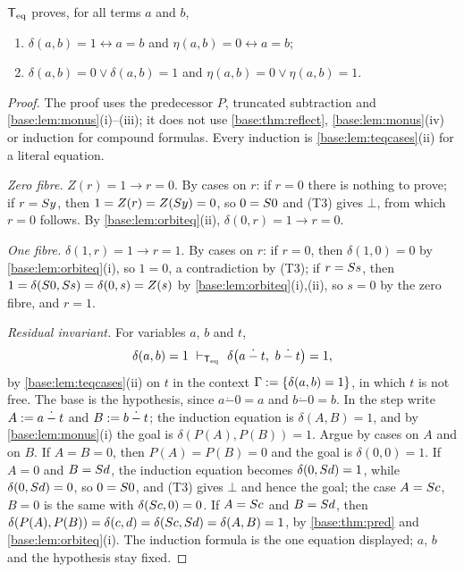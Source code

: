 \begin{theorem}
\label{base:thm:orbitreflect}
$\mathsf{T}_{\mathrm{eq}}$ proves, for all terms $a$ and $b$,
\begin{enumerate}[label=\textup{(\roman*)}]
\item $\delta(a,b)=1\leftrightarrow a=b$ and $\eta(a,b)=0\leftrightarrow a=b$;
\item $\delta(a,b)=0\vee\delta(a,b)=1$ and $\eta(a,b)=0\vee\eta(a,b)=1$.
\end{enumerate}
\end{theorem}

\begin{proof}
The proof uses the predecessor $P$, truncated subtraction and
\cref{base:lem:monus}(i)--(iii); it does not use \cref{base:thm:reflect},
\cref{base:lem:monus}(iv) or induction for compound formulas.  Every
induction is \cref{base:lem:teqcases}(ii) for a literal equation.

\emph{Zero fibre.}  $Z(r)=1\to r=0$.  By cases on $r$: if $r=0$ there is
nothing to prove; if $r=S y$, then $1=Z(r)=Z(S y)=0$, so $0=S 0$
and (T3) gives $\bot$, from which $r=0$ follows.  By
\cref{base:lem:orbiteq}(ii), $\delta(0,r)=1\to r=0$.

\emph{One fibre.}  $\delta(1,r)=1\to r=1$.  By cases on $r$: if $r=0$, then
$\delta(1,0)=0$ by \cref{base:lem:orbiteq}(i), so $1=0$, a contradiction by
(T3); if $r=S s$, then
$1=\delta(S 0,S s)=\delta(0,s)=Z(s)$ by
\cref{base:lem:orbiteq}(i),(ii), so $s=0$ by the zero fibre, and $r=1$.

\emph{Residual invariant.}  For variables $a$, $b$ and $t$,
\[
 \delta(a,b)=1\ \proves_{\Teq}\ \delta\bigl(a\mathbin{\dot-}t,\ b\mathbin{\dot-}t\bigr)=1,
\]
by \cref{base:lem:teqcases}(ii) on $t$ in the context
$\Gamma\mathrel{:=}\{\delta(a,b)=1\}$, in which $t$ is not free.  The base is
the hypothesis, since $a\mathbin{\dot-}0=a$ and $b\mathbin{\dot-}0=b$.  In
the step write $A\mathrel{:=} a\mathbin{\dot-}t$ and $B\mathrel{:=} b\mathbin{\dot-}t$;
the induction equation is $\delta(A,B)=1$, and by
\cref{base:lem:monus}(i) the goal is $\delta(P(A),P(B))=1$.  Argue by cases
on $A$ and on $B$.  If $A=B=0$, then $P(A)=P(B)=0$ and the goal is
$\delta(0,0)=1$.  If $A=0$ and $B=S d$, the induction equation becomes
$\delta(0,S d)=1$, while $\delta(0,S d)=0$, so $0=S 0$, and (T3)
gives $\bot$ and hence the goal; the case $A=S c$, $B=0$ is the same
with $\delta(S c,0)=0$.  If $A=S c$ and $B=S d$, then
$\delta(P(A),P(B))=\delta(c,d)=\delta(S c,S d)=\delta(A,B)=1$, by
\cref{base:thm:pred} and \cref{base:lem:orbiteq}(i).  The induction formula
is the one equation displayed; $a$, $b$ and the hypothesis stay fixed.


\end{proof}
